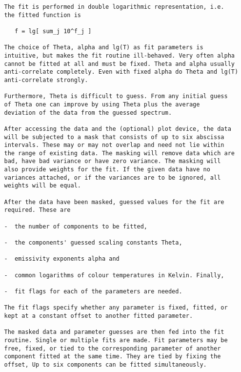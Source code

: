 \begin{description}
\begin{verbatim}
   The fit is performed in double logarithmic representation, i.e.
   the fitted function is

      f = lg[ sum_j 10^f_j ]

   The choice of Theta, alpha and lg(T) as fit parameters is
   intuitive, but makes the fit routine ill-behaved. Very often alpha
   cannot be fitted at all and must be fixed. Theta and alpha usually
   anti-correlate completely. Even with fixed alpha do Theta and lg(T)
   anti-correlate strongly.

   Furthermore, Theta is difficult to guess. From any initial guess
   of Theta one can improve by using Theta plus the average
   deviation of the data from the guessed spectrum.

   After accessing the data and the (optional) plot device, the data
   will be subjected to a mask that consists of up to six abscissa
   intervals. These may or may not overlap and need not lie within
   the range of existing data. The masking will remove data which are
   bad, have bad variance or have zero variance. The masking will
   also provide weights for the fit. If the given data have no
   variances attached, or if the variances are to be ignored, all
   weights will be equal.

   After the data have been masked, guessed values for the fit are
   required. These are

   -  the number of components to be fitted,

   -  the components' guessed scaling constants Theta,

   -  emissivity exponents alpha and

   -  common logarithms of colour temperatures in Kelvin. Finally,

   -  fit flags for each of the parameters are needed.

   The fit flags specify whether any parameter is fixed, fitted, or
   kept at a constant offset to another fitted parameter.

   The masked data and parameter guesses are then fed into the fit
   routine. Single or multiple fits are made. Fit parameters may be
   free, fixed, or tied to the corresponding parameter of another
   component fitted at the same time. They are tied by fixing the
   offset, Up to six components can be fitted simultaneously.


\end{verbatim}
\end{description}
